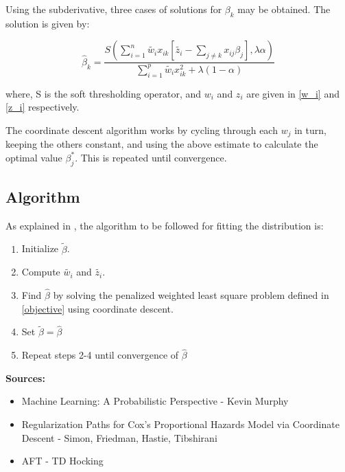 \documentclass[12pt,a4paper]{report}
\begin{document}
Using the subderivative, three cases of solutions for $\beta_k$ may be obtained. The solution is given by:

\begin{equation}
\hat \beta_k = \frac{S\left(\sum_{i=1}^n \widetilde{w_i} x_{ik} \left[\widetilde{ z_i} - \sum_{j \ne k} x_{ij} \beta_j \right], \lambda \alpha \right)}
					{\sum_{i=1}^p \widetilde{w_i} x_{ik}^2 + \lambda (1- \alpha)}
\end{equation}

where, S is the soft thresholding operator, and $w_i$ and $z_i$ are given in \ref{w_i} and \ref{z_i} respectively.

The coordinate descent algorithm works by
cycling through each $w_j$ in turn, keeping the others constant, and using the above estimate to calculate the optimal value
$\beta^*_j$. This is repeated until convergence.

\subsection*{Algorithm}
As explained in \cite{coxnet}, the algorithm to be followed for fitting the distribution is:
\begin{enumerate}
\item Initialize $\widetilde{ \beta}$.
\item Compute $\widetilde{ w_i}$ and $\widetilde{ z_i}$.
\item Find $\hat \beta$ by solving the penalized weighted least square problem defined in \ref{objective} using coordinate descent.
\item Set $\widetilde{ \beta} = \hat \beta$
\item Repeat steps 2-4 until convergence of $\hat \beta$
\end{enumerate}

\vspace{8mm}
\textbf{Sources:}
\begin{itemize}
\item Machine Learning: A Probabilistic Perspective - Kevin Murphy
\item Regularization Paths for Cox's Proportional Hazards Model via Coordinate Descent - Simon, Friedman, Hastie, Tibshirani
\item AFT - TD Hocking
\end{itemize}
\end{document}
